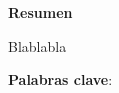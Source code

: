 
\begin{center}

\textbf{}

\vspace{2cm}

\Large{\textbf{Resumen}}

\end{center}

\vspace{1cm}

Blablabla

\vspace{1cm}

\textbf{Palabras clave}:

\vspace{3cm}


